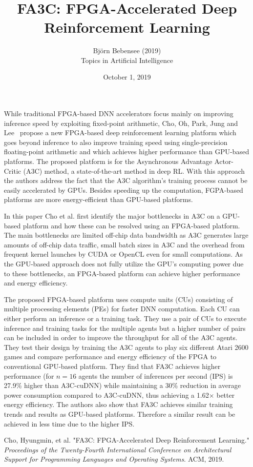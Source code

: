 \documentclass[12pt]{article}
\begin{document}
 
 
\title{FA3C: FPGA-Accelerated Deep Reinforcement Learning}
\author{Bj\"orn Bebensee (2019)\\ %
Topics in Artificial Intelligence}
\date{October 1, 2019}
\maketitle

\noindent
While traditional FPGA-based DNN accelerators focus mainly on improving inference speed by exploiting fixed-point arithmetic, Cho, Oh, Park, Jung and Lee~\cite{cho} propose a new FPGA-based deep reinforcement learning platform which goes beyond inference to also improve training speed using single-precision floating-point arithmetic and which achieves higher performance than GPU-based platforms. The proposed platform is for the Asynchronous Advantage Actor-Critic (A3C) method, a state-of-the-art method in deep RL. With this approach the authors address the fact that the A3C algorithm's training process cannot be easily accelerated by GPUs. Besides speeding up the computation, FGPA-based platforms are more energy-efficient than GPU-based platforms.

In this paper Cho et al. first identify the major bottlenecks in A3C on a GPU-based platform and how these can be resolved using an FPGA-based platform. The main bottlenecks are limited off-chip data bandwidth as A3C generates large amounts of off-chip data traffic, small batch sizes in A3C and the overhead from frequent kernel launches by CUDA or OpenCL even for small computations. As the GPU-based approach does not fully utilize the GPU's computing power due to these bottlenecks, an FPGA-based platform can achieve higher performance and energy efficiency.

The proposed FPGA-based platform uses compute units (CUs) consisting of multiple processing elements (PEs) for faster DNN computation. Each CU can either perform an inference or a training task. They use a pair of CUs to execute inference and training tasks for the multiple agents but a higher number of pairs can be included in order to improve the throughput for all of the A3C agents. They test their design by training the A3C agents to play six different Atari 2600 games and compare performance and energy efficiency of the FPGA to conventional GPU-based platform. They find that FA3C achieves higher performance (for $n=16$ agents the number of inferences per second (IPS) is 27.9\% higher than A3C-cuDNN) while maintaining a 30\% reduction in average power consumption compared to A3C-cuDNN, thus achieving a 1.62$\times$ better energy efficiency. The authors also show that FA3C achieves similar training trends and results as GPU-based platforms. Therefore a similar result can be achieved in less time due to the higher IPS.


\begin{thebibliography}{9}
Cho, Hyungmin, et al. "FA3C: FPGA-Accelerated Deep Reinforcement Learning." \emph{Proceedings of the Twenty-Fourth International Conference on Architectural Support for Programming Languages and Operating Systems}. ACM, 2019.

\end{thebibliography}
 
\end{document}
